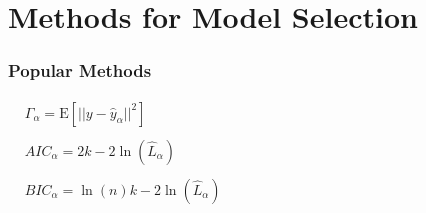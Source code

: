 \documentclass[20pt,mathserif]{beamer}
\newcommand{\E}{\mathrm{E}}
\begin{document}
\thispagestyle{empty}
\section{Methods for Model Selection}

\begin{frame}
\frametitle{Popular Methods}

\begin{align*}
&\Gamma_\alpha=\E\left[||y-\hat{y}_\alpha||^2\right]
\\\\
&AIC_\alpha = 2k - 2\ln(\hat{L}_\alpha)\hspace{30cm}
\\\\
&BIC_\alpha = \ln(n)k - 2\ln(\hat{L}_\alpha)
\end{align*}
\end{frame}
\end{document}
